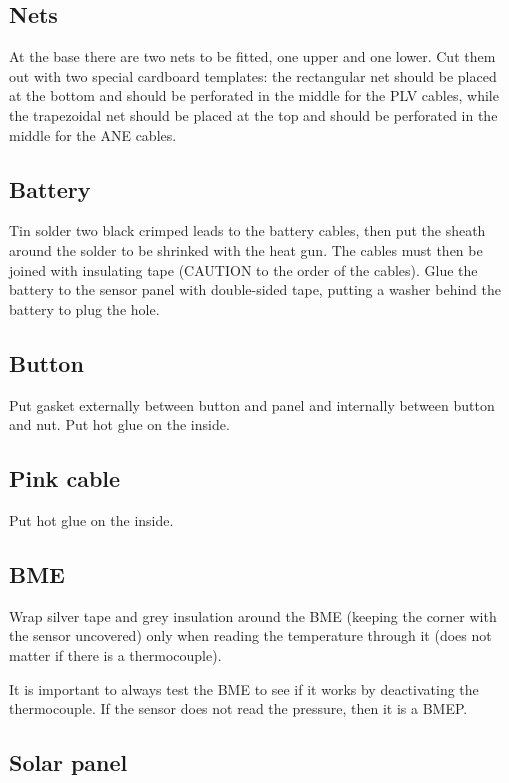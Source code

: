 \subsection{Nets}

    At the base there are two nets to be fitted, one upper and one lower.
    Cut them out with two special cardboard templates: the rectangular net should be placed at the bottom and should be perforated in the middle for the PLV cables, while the trapezoidal net should be placed at the top and should be perforated in the middle for the ANE cables.
    
\subsection{Battery}

    Tin solder two black crimped leads to the battery cables, then put the sheath around the solder to be shrinked with the heat gun. The cables must then be joined with insulating tape (CAUTION to the order of the cables).
    Glue the battery to the sensor panel with double-sided tape, putting a washer behind the battery to plug the hole.
    
\subsection{Button}

    Put gasket externally between button and panel and internally between button and nut. Put hot glue on the inside.
    
\subsection{Pink cable}

    Put hot glue on the inside.
    
\subsection{BME}

    Wrap silver tape and grey insulation around the BME (keeping the corner with the sensor uncovered) only when reading the temperature through it (does not matter if there is a thermocouple).

It is important to always test the BME to see if it works by deactivating the thermocouple. If the sensor does not read the pressure, then it is a BMEP.

\subsection{Solar panel}

